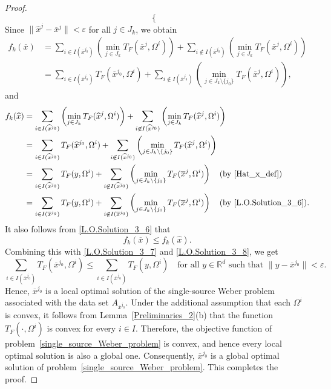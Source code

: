 \documentclass[10pt,a4paper]{amsart}
\def\Hat{\widehat}
\begin{document}
\begin{proof}
\begin{equation}
\begin{cases}
	\end{cases}
    \end{equation}
    Since $\|\Hat{x}^j-\overline{x}^j\|<\varepsilon$ for all $j \in J_k$, we obtain
	\begin{equation}
		\label{L.O.Solution_3_7}
		\begin{aligned}
			f_k(\overline{x})&=\sum_{i \in I(\overline{x}^{j_0})}\left(\min_{j \in J_k}T_F(\overline{x}^j,\Omega^i) \right)+\sum_{i \not\in I(\overline{x}^{j_0})}\left(\min_{j \in J_k}T_F(\overline{x}^j,\Omega^i) \right)\\
			&=\sum_{i \in I(\overline{x}^{j_0})}T_F(\overline{x}^{j_0},\Omega^i) +\sum_{i \not\in I(\overline{x}^{j_0})}\left(\min_{j \in J_k\setminus \{j_0\}}T_F(\overline{x}^j,\Omega^i) \right),
		\end{aligned}
	\end{equation}
	and
	\begin{equation}
		\label{L.O.Solution_3_8}
		\begin{aligned}
			f_k(\Hat{x})    &=\sum_{i \in I(\Hat{x}^{j_0})}\left(\min_{j \in J_k}T_F(\Hat{x}^j,\Omega^i) \right)+\sum_{i \not\in I(\Hat{x}^{j_0})}\left(\min_{j \in J_k}T_F(\Hat{x}^j,\Omega^i) \right)\\
            &=\sum_{i \in I(\Hat{x}^{j_0})}T_F(\Hat{x}^{j_0},\Omega^i) +\sum_{i \not\in I(\Hat{x}^{j_0})}\left(\min_{j \in J_k\setminus\{j_0\}}T_F(\Hat{x}^j,\Omega^i) \right)\\
			&=\sum_{i \in I(\Hat{x}^{j_0})}T_F(y,\Omega^i)+\sum_{i \not\in I(\Hat{x}^{j_0})}\left(\min_{j \in J_k\setminus\{j_0\}}T_F(\overline{x}^j,\Omega^i) \right) \quad (\text{by \eqref{Hat_x_def}})\\
			&=\sum_{i \in I(\overline{x}^{j_0})}T_F(y,{\Omega^i})+\sum_{i \not\in I(\overline{x}^{j_0})}\left(\min_{j \in J_k \setminus \{j_0\}}T_F(\overline{x}^j,{\Omega^i}) \right) \quad (\text{by \eqref{L.O.Solution_3_6}}).
		\end{aligned}
	\end{equation}
    It also follows from \eqref{L.O.Solution_3_6} that
	\[
	f_k(\overline{x}) \le f_k(\Hat{x}).
	\]
	Combining this with \eqref{L.O.Solution_3_7} and \eqref{L.O.Solution_3_8}, we get
	\[
	\sum_{i \in I(\overline{x}^{j_0})} T_F(\overline{x}^{j_0},\Omega^i) \le \sum_{i \in I(\overline{x}^{j_0})} T_F(y,\Omega^i) 
	\quad \text{for all } y \in \mathbb{R}^d \text{ such that } \|y-\overline{x}^{j_0}\|<\varepsilon.
	\]
	Hence, $\overline{x}^{j_0}$ is a local optimal solution of the single-source Weber problem associated with the data set $A_{\overline{x}^{j_0}}$. Under the additional assumption that each $\Omega^i$ is convex, it follows from Lemma~\ref{Preliminaries_2}(b) that the function $T_F(\cdot,\Omega^i)$ is convex for every $i\in I$. Therefore, the objective function of problem~\eqref{single_source_Weber_problem} is convex, and hence every local optimal solution is also a global one. Consequently, $\overline{x}^{j_0}$ is a global optimal solution of problem~\eqref{single_source_Weber_problem}. This completes the proof.
\end{proof}
\end{document}
